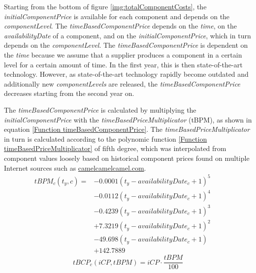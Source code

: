 Starting from the bottom of figure \ref{img:totalComponentCosts}, the \textit{initialComponentPrice} is available for each component and depends on the \textit{componentLevel}.
The \textit{timeBasedComponentPrice} depends on the \textit{time}, on the \textit{availabilityDate} of a component, and on the \textit{initialComponentPrice}, which in turn depends on the \textit{componentLevel}.
The \textit{timeBasedComponentPrice} is dependent on the \textit{time} because we assume that a supplier produces a component in a certain level for a certain amount of time. In the first year, this is then state-of-the-art technology. However, as state-of-the-art technology rapidly become outdated and additionally new \textit{componentLevels} are released, the \textit{timeBasedComponentPrice} decreases starting from the second year on.

The \textit{timeBasedComponentPrice} is calculated by multiplying the \textit{initialComponentPrice} with the \textit{timeBasedPriceMultiplicator} (tBPM), as shown in equation \ref{Function timeBasedComponentPrice}. The \textit{timeBasedPriceMultiplicator} in turn is calculated according to the polynomic function \ref{Function timeBasedPriceMultiplicator} of fifth degree, which was interpolated from component values loosely based on historical component prices found on multiple Internet sources such as \href{https://camelcamelcamel.com}{camelcamelcamel.com}.
\begin{equation}
\label{Function timeBasedPriceMultiplicator}
\begin{aligned}
   tBPM_{c}(t_y, c) = & - 0.0001(t_y-availabilityDate_{c}+1)^5 \\
   & - 0.0112(t_y-availabilityDate_{c}+1)^4 \\
   & - 0.4239(t_y-availabilityDate_{c}+1)^3 \\
   & + 7.3219(t_y-availabilityDate_{c}+1)^2 \\
   & - 49.698(t_y-availabilityDate_{c}+1) \\
   & + 142.7889 &&
\end{aligned}   
\end{equation}
\begin{equation}
\label{Function timeBasedComponentPrice}
    tBCP_{c} (iCP, tBPM) = iCP \cdot \dfrac{tBPM}{100}
\end{equation}


